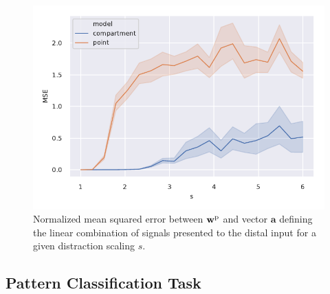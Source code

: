 \documentclass[10pt,a4paper]{article}
\begin{document}
\begin{figure}
	\includegraphics[width=\textwidth]{./figures/distraction_scaling.pdf}
	\caption{Normalized mean squared error between $\mathbf{w}^{\rm p}$ and vector $\mathbf{a}$ defining the linear combination of signals presented to the distal input for a given distraction scaling $s$.}
	\label{fig:distraction_scaling}
\end{figure}

\subsection{Pattern Classification Task}
\end{document}
